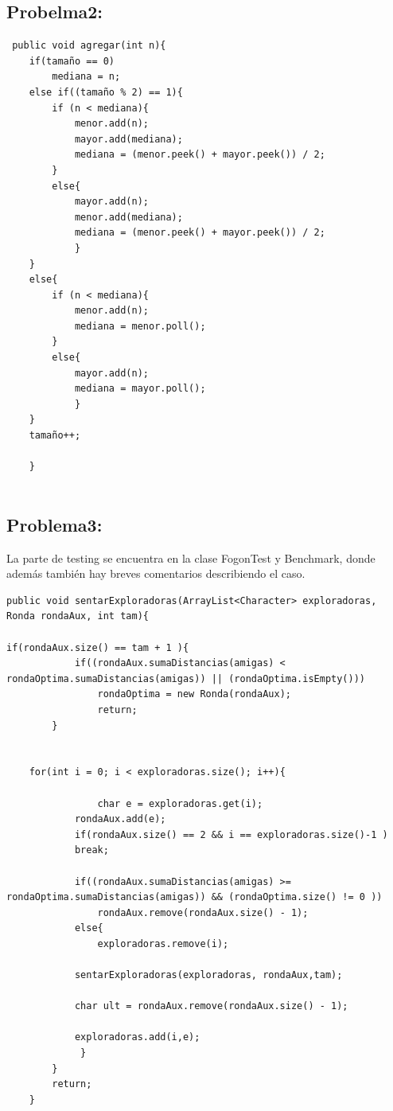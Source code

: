 \documentclass[10pt, a4paper]{article}
\begin{document}
\subsection{Probelma2:}
\begin{verbatim}
 public void agregar(int n){
	if(tamaño == 0)
		mediana = n;
	else if((tamaño % 2) == 1){ 
		if (n < mediana){ 
			menor.add(n);
			mayor.add(mediana); 
			mediana = (menor.peek() + mayor.peek()) / 2; 
		}
		else{
			mayor.add(n);
			menor.add(mediana);
			mediana = (menor.peek() + mayor.peek()) / 2;
			}
	}
	else{
		if (n < mediana){
			menor.add(n);
			mediana = menor.poll();
		}
		else{
			mayor.add(n);
			mediana = mayor.poll();
			}
	}
	tamaño++;
		
	}


\end{verbatim}

\subsection{Problema3:}
La parte de testing se encuentra en la clase FogonTest y Benchmark, donde además también hay breves comentarios describiendo el caso.
\begin{verbatim}
public void sentarExploradoras(ArrayList<Character> exploradoras, Ronda rondaAux, int tam){

if(rondaAux.size() == tam + 1 ){ 			
		    if((rondaAux.sumaDistancias(amigas) < rondaOptima.sumaDistancias(amigas)) || (rondaOptima.isEmpty()))
				rondaOptima = new Ronda(rondaAux);
				return;
		}	
		

	for(int i = 0; i < exploradoras.size(); i++){

				char e = exploradoras.get(i);
			rondaAux.add(e);
			if(rondaAux.size() == 2 && i == exploradoras.size()-1 )
			break;	
		
			if((rondaAux.sumaDistancias(amigas) >= rondaOptima.sumaDistancias(amigas)) && (rondaOptima.size() != 0 ))
				rondaAux.remove(rondaAux.size() - 1);	
			else{
				exploradoras.remove(i);
			
			sentarExploradoras(exploradoras, rondaAux,tam);
						
			char ult = rondaAux.remove(rondaAux.size() - 1);

			exploradoras.add(i,e);
			 }
		}	
		return;
	}

\end{verbatim}
\end{document}
